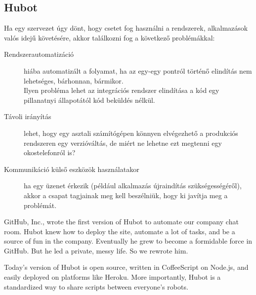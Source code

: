 \subsection{Hubot}
Ha egy szervezet úgy dönt, hogy csetet fog használni a rendszerek, alkalmazások valós idejű követésére, akkor találkozni fog a következő problémákkal:
\begin{description}
\item[Rendszerautomatizáció] hiába automatizált a folyamat, ha az egy-egy pontról történő elindítás nem lehetséges, bárhonnan, bármikor.\\
Ilyen probléma lehet az integrációs rendszer elindítása a kód egy pillanatnyi állapotától kód beküldés nélkül.
\item[Távoli irányítás] lehet, hogy egy asztali számítógépen könnyen elvégezhető a produkciós rendszeren egy verzióváltás, de miért ne lehetne ezt megtenni egy okostelefonról is?
\item[Kommunikáció külső eszközök használatakor] ha egy üzenet érkezik (például alkalmazás újraindítás szükségességéről), akkor a csapat tagjainak meg kell beszélniük, hogy ki javítja meg a problémát.
\end{description}
GitHub, Inc., wrote the first version of Hubot to automate our company chat room. Hubot knew how to deploy the site, automate a lot of tasks, and be a source of fun in the company. Eventually he grew to become a formidable force in GitHub. But he led a private, messy life. So we rewrote him.

Today's version of Hubot is open source, written in CoffeeScript on Node.js, and easily deployed on platforms like Heroku. More importantly, Hubot is a standardized way to share scripts between everyone's robots.